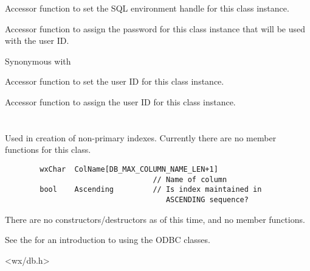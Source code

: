 \label{wxdbconnectinfsethenv}


Accessor function to set the SQL environment handle for this class instance.

\label{wxdbconnectinfsetpassword}


Accessor function to assign the password for this class
instance that will be used with the user ID.

Synonymous with 

\label{wxdbconnectinfsetuid}


Accessor function to set the user ID for this class instance.

\label{wxdbconnectinfsetuserid}


Accessor function to assign the user ID for this class instance.

\section{}\label{wxdbidxdef}

Used in creation of non-primary indexes.  Currently there are no member
functions for this class.

\begin{verbatim}
        wxChar  ColName[DB_MAX_COLUMN_NAME_LEN+1]
                                  // Name of column
        bool    Ascending         // Is index maintained in
                                     ASCENDING sequence?
\end{verbatim}

There are no constructors/destructors as of this time, and no member functions.

See the  for
an introduction to using the ODBC classes.



<wx/db.h>

\section{}\label{wxdbinf}

